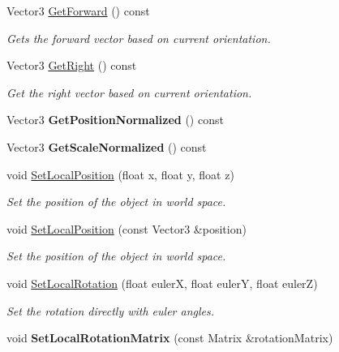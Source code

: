 \begin{DoxyCompactItemize}
Vector3 \hyperlink{classTransformComponent_a71e0adb8dd3a35fdca3b50817bb807a4}{Get\+Forward} () const
\begin{DoxyCompactList}\small\item\em Gets the forward vector based on current orientation. \end{DoxyCompactList}\item 
Vector3 \hyperlink{classTransformComponent_a5fe2a35d3bcb6a07a231b0f463d6a64b}{Get\+Right} () const
\begin{DoxyCompactList}\small\item\em Get the right vector based on current orientation. \end{DoxyCompactList}\item 
\mbox{\label{classTransformComponent_a859926592b1550b27fc93ccb4da1e163}} 
Vector3 {\bfseries Get\+Position\+Normalized} () const
\item 
\mbox{\label{classTransformComponent_ae220c31211dd608d79d6eed78598562e}} 
Vector3 {\bfseries Get\+Scale\+Normalized} () const
\item 
void \hyperlink{classTransformComponent_a63fa0293901b73ed16151fb3ca0c81f3}{Set\+Local\+Position} (float x, float y, float z)
\begin{DoxyCompactList}\small\item\em Set the position of the object in world space. \end{DoxyCompactList}\item 
void \hyperlink{classTransformComponent_ac25ddafb688708cba6001e221fdd0b9d}{Set\+Local\+Position} (const Vector3 \&position)
\begin{DoxyCompactList}\small\item\em Set the position of the object in world space. \end{DoxyCompactList}\item 
void \hyperlink{classTransformComponent_aa1c412032c23c21644c84646e1e271ce}{Set\+Local\+Rotation} (float eulerX, float eulerY, float eulerZ)
\begin{DoxyCompactList}\small\item\em Set the rotation directly with euler angles. \end{DoxyCompactList}\item 
\mbox{\label{classTransformComponent_ae600cd0a90c25a1881c9b8b08cb8bde0}} 
void {\bfseries Set\+Local\+Rotation\+Matrix} (const Matrix \&rotation\+Matrix)
\end{DoxyCompactItemize}
